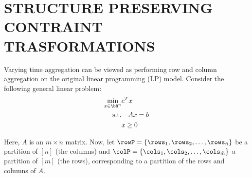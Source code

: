 \documentclass[smallextended,natbib]{svjour3}       %
\numberwithin{theorem}{section}
\begin{document}


















\section{STRUCTURE PRESERVING CONTRAINT TRASFORMATIONS}\label{appendix B}

Varying time aggregation can be viewed as performing row and column aggregation on the original linear programming (LP) model. Consider the following general linear problem:
\begin{align}
\label{eq:LP}
\min_{x \in \bR^{n}} &c^T x \\ 
\text{s.t.} &\quad Ax = b \\
&x \geq 0
\end{align}

Here, \(A\) is an \(m \times n\) matrix. Now, let \(\rowP = \{\rows_1, \rows_2, \ldots, \rows_{\tilde{n}}\}\) be a partition of \([n]\) (the columns) and \(\colP = \{\cols_1, \cols_2, \ldots, \cols_{\tilde{m}}\}\) a partition of \([m]\) (the rows), corresponding to a partition of the rows and columns of \(A\).
\end{document}
